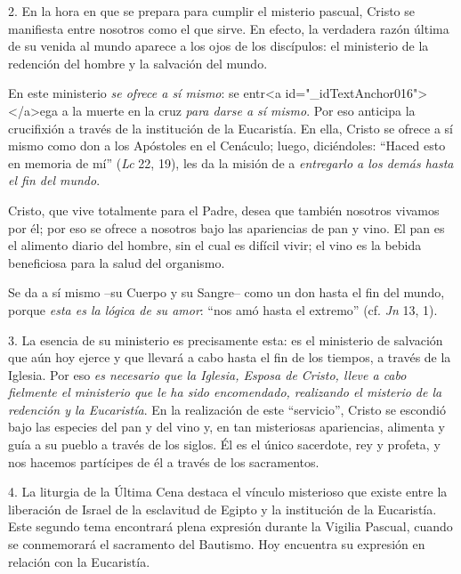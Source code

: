 			\begin{body}2. En la hora en que se prepara para cumplir el misterio pascual, Cristo se manifiesta entre nosotros como el que sirve. En efecto, la verdadera razón última de su venida al mundo aparece a los ojos de los discípulos: el ministerio de la redención del hombre y la salvación del mundo. \end{body}
			
			\begin{body}En este ministerio \textit{se ofrece a sí mismo}: se entr<a id="_idTextAnchor016"></a>ega a la muerte en la cruz \textit{para darse a sí mismo}. Por eso anticipa la crucifixión a través de la institución de la Eucaristía. En ella, Cristo se ofrece a sí mismo como don a los Apóstoles en el Cenáculo; luego, diciéndoles: “Haced esto en memoria de mí” (\textit{Lc }22, 19), les da la misión de a\textit{ entregarlo a los demás hasta el fin del mundo}. \end{body}
			
			\begin{body}Cristo, que vive totalmente para el Padre, desea que también nosotros vivamos por él; por eso se ofrece a nosotros bajo las apariencias de pan y vino. El pan es el alimento diario del hombre, sin el cual es difícil vivir; el vino es la bebida beneficiosa para la salud del organismo. \end{body}
			
			\begin{body}Se da a sí mismo –su Cuerpo y su Sangre– como un don hasta el fin del mundo, porque \textit{esta es la lógica de su amor}: “nos amó hasta el extremo” (cf. \textit{Jn} 13, 1). \end{body}
			
			\begin{body}3. La esencia de su ministerio es precisamente esta: es el ministerio de salvación que aún hoy ejerce y que llevará a cabo hasta el fin de los tiempos, a través de la Iglesia. Por eso \textit{es necesario que la Iglesia, Esposa de Cristo, lleve a cabo fielmente el ministerio que le ha sido encomendado, realizando el misterio de la redención y la Eucaristía}. En la realización de este “servicio”, Cristo se escondió bajo las especies del pan y del vino y, en tan misteriosas apariencias, alimenta y guía a su pueblo a través de los siglos. Él es el único sacerdote, rey y profeta, y nos hacemos partícipes de él a través de los sacramentos. \end{body}
			
			\begin{body}4. La liturgia de la Última Cena destaca el vínculo misterioso que existe entre la liberación de Israel de la esclavitud de Egipto y la institución de la Eucaristía. Este segundo tema encontrará plena expresión durante la Vigilia Pascual, cuando se conmemorará el sacramento del Bautismo. Hoy encuentra su expresión en relación con la Eucaristía. \end{body}
			
